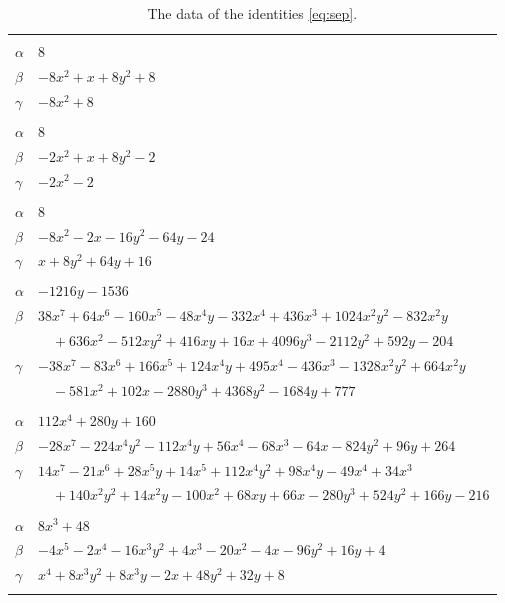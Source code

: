 \documentclass[11pt]{article}
\begin{document}
\begingroup\footnotesize
\setlength{\LTcapwidth}{\textwidth}
\begin{longtable}{@{}ll@{}}
\caption{The data of the identities \eqref{eq:sep}.}\label{tab:sep}\\
\hline\endfirsthead\hline\endhead\hline\endfoot
\multicolumn{2}{@{}l}{$\{i,j\}=\{0,1\}$, $k_{ij}=2^{4}$}\\
$\alpha$ & $8$\\
$\beta$ & $-8x^{2}+x+8y^{2}+8$\\
$\gamma$ & $-8x^{2}+8$\\
\addlinespace[3pt]
\multicolumn{2}{@{}l}{$\{i,j\}=\{0,4\}$, $k_{ij}=2^{4}$}\\
$\alpha$ & $8$\\
$\beta$ & $-2x^{2}+x+8y^{2}-2$\\
$\gamma$ & $-2x^{2}-2$\\
\addlinespace[3pt]
\multicolumn{2}{@{}l}{$\{i,j\}=\{1,3\}$, $k_{ij}=2^{4}$}\\
$\alpha$ & $8$\\
$\beta$ & $-8x^{2}-2x-16y^{2}-64y-24$\\
$\gamma$ & $x+8y^{2}+64y+16$\\
\addlinespace[3pt]
\multicolumn{2}{@{}l}{$\{i,j\}=\{2,3\}$, $k_{ij}=2\cdot 3^{2}$}\\
$\alpha$ & $-1216y-1536$\\
$\beta$ & $38x^{7}+64x^{6}-160x^{5}-48x^{4}y-332x^{4}+436x^{3}+1024x^{2}y^{2}-832x^{2}y$\\
 & $\quad +636x^{2}-512xy^{2}+416xy+16x+4096y^{3}-2112y^{2}+592y-204$\\
$\gamma$ & $-38x^{7}-83x^{6}+166x^{5}+124x^{4}y+495x^{4}-436x^{3}-1328x^{2}y^{2}+664x^{2}y$\\
 & $\quad -581x^{2}+102x-2880y^{3}+4368y^{2}-1684y+777$\\
\addlinespace[3pt]
\multicolumn{2}{@{}l}{$\{i,j\}=\{2,4\}$, $k_{ij}=2^{10}$}\\
$\alpha$ & $112x^{4}+280y+160$\\
$\beta$ & $-28x^{7}-224x^{4}y^{2}-112x^{4}y+56x^{4}-68x^{3}-64x-824y^{2}+96y+264$\\
$\gamma$ & $14x^{7}-21x^{6}+28x^{5}y+14x^{5}+112x^{4}y^{2}+98x^{4}y-49x^{4}+34x^{3}$\\
 & $\quad +140x^{2}y^{2}+14x^{2}y-100x^{2}+68xy+66x-280y^{3}+524y^{2}+166y-216$\\
\addlinespace[3pt]
\multicolumn{2}{@{}l}{$\{i,j\}=\{3,4\}$, $k_{ij}=2^{3}\cdot 3$}\\
$\alpha$ & $8x^{3}+48$\\
$\beta$ & $-4x^{5}-2x^{4}-16x^{3}y^{2}+4x^{3}-20x^{2}-4x-96y^{2}+16y+4$\\
$\gamma$ & $x^{4}+8x^{3}y^{2}+8x^{3}y-2x+48y^{2}+32y+8$\\
\addlinespace[3pt]
\end{longtable}
\endgroup
\end{document}
